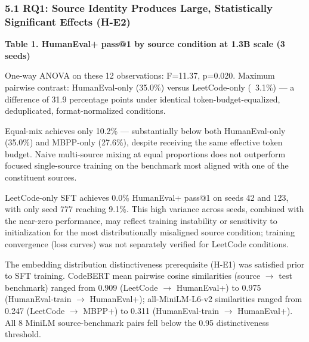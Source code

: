 
\subsubsection{5.1 RQ1: Source Identity Produces Large, Statistically Significant Effects (H-E2)}

\textbf{Table 1. HumanEval+ pass@1 by source condition at 1.3B scale (3 seeds)}

\begin{table}[htbp]
\centering
{}
\end{table}

One-way ANOVA on these 12 observations: F=11.37, p=0.020. Maximum pairwise contrast: HumanEval-only (35.0\%) versus LeetCode-only (~3.1\%) --- a difference of 31.9 percentage points under identical token-budget-equalized, deduplicated, format-normalized conditions.

Equal-mix achieves only 10.2\% --- substantially below both HumanEval-only (35.0\%) and MBPP-only (27.6\%), despite receiving the same effective token budget. Naive multi-source mixing at equal proportions does not outperform focused single-source training on the benchmark most aligned with one of the constituent sources.

LeetCode-only SFT achieves 0.0\% HumanEval+ pass@1 on seeds 42 and 123, with only seed 777 reaching 9.1\%. This high variance across seeds, combined with the near-zero performance, may reflect training instability or sensitivity to initialization for the most distributionally misaligned source condition; training convergence (loss curves) was not separately verified for LeetCode conditions.

The embedding distribution distinctiveness prerequisite (H-E1) was satisfied prior to SFT training. CodeBERT mean pairwise cosine similarities (source $\rightarrow$ test benchmark) ranged from 0.909 (LeetCode $\rightarrow$ HumanEval+) to 0.975 (HumanEval-train $\rightarrow$ HumanEval+); all-MiniLM-L6-v2 similarities ranged from 0.247 (LeetCode $\rightarrow$ MBPP+) to 0.311 (HumanEval-train $\rightarrow$ HumanEval+). All 8 MiniLM source-benchmark pairs fell below the 0.95 distinctiveness threshold.


